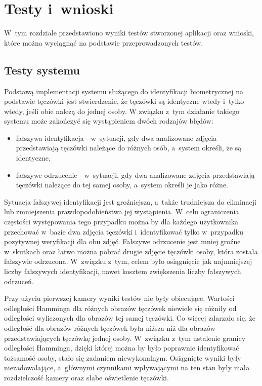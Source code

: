 \chapter{Testy i~wnioski}
\label{cha:testywnioski}
W~tym rozdziale przedstawiono wyniki testów stworzonej aplikacji oraz wnioski, które można wyciągnąć na podstawie przeprowadzonych testów.

\section{Testy systemu}
\label{sec:testy}
Podstawą implementacji systemu służącego do identyfikacji biometrycznej na podstawie tęczówki jest stwierdzenie, że tęczówki są identyczne wtedy i~tylko wtedy, jeśli obie należą do jednej osoby. W związku z~tym działanie takiego systemu może zakończyć się wystąpieniem dwóch rodzajów błędów:
\begin{itemize}
\item fałszywa identyfikacja - w~sytuacji, gdy dwa analizowane zdjęcia przedstawiają tęczówki należące do różnych osób, a~system określi, że są identyczne,
\item fałszywe odrzucenie - w~sytuacji, gdy dwa analizowane zdjęcia przedstawiają tęczówki należące do tej samej osoby, a~system określi je jako różne.
\end{itemize}
Sytuacja fałszywej identyfikacji jest groźniejsza, a~także trudniejsza do eliminacji lub zmniejszenia prawdopodobieństwa jej wystąpienia. W~celu ograniczenia częstości występowania tego przypadku można by dla każdego użytkownika przechować w~bazie dwa zdjęcia tęczówki i~identyfikować tylko w~przypadku pozytywnej weryfikacji dla obu zdjęć. Fałszywe odrzucenie jest mniej groźne w~skutkach oraz łatwo można pobrać drugie zdjęcie tęczówki osoby, która została fałszywie odrzucona. W~związku z~tym, celem było osiągnięcie jak najmniejszej liczby fałszywych identyfikacji, nawet kosztem zwiększenia liczby fałszywych odrzuceń.

Przy użyciu pierwszej kamery wyniki testów nie były obiecujące. Wartości odległości Hamminga dla różnych obrazów tęczówek niewiele się różniły od odległości wyliczonych dla obrazów tej samej tęczówki. Co więcej zdarzało się, że odległość dla obrazów różnych tęczówek była niższa niż dla obrazów przedstawiających tęczówkę jednej osoby. W~związku z~tym ustalenie granicy odległości Hamminga, dzięki której można by było poprawnie identyfikować tożsamość osoby, stało się zadaniem niewykonalnym. Osiągnięte wyniki były niezadowalające, a~głównymi czynnikami wpływającymi na ten stan były mała rozdzielczość kamery oraz słabe oświetlenie tęczówki.


